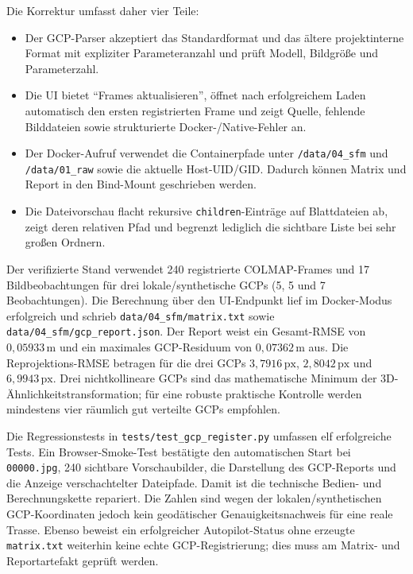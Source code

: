 \documentclass[12pt,a4paper]{article}
\begin{document}
Die Korrektur umfasst daher vier Teile:
\begin{itemize}[noitemsep]
    \item Der GCP-Parser akzeptiert das Standardformat und das ältere
        projektinterne Format mit expliziter Parameteranzahl und prüft
        Modell, Bildgröße und Parameterzahl.
    \item Die UI bietet ``Frames aktualisieren'', öffnet nach erfolgreichem
        Laden automatisch den ersten registrierten Frame und zeigt Quelle,
        fehlende Bilddateien sowie strukturierte Docker-/Native-Fehler an.
    \item Der Docker-Aufruf verwendet die Containerpfade unter
        \texttt{/data/04\_sfm} und \texttt{/data/01\_raw} sowie die aktuelle
        Host-UID/GID. Dadurch können Matrix und Report in den Bind-Mount
        geschrieben werden.
    \item Die Dateivorschau flacht rekursive \texttt{children}-Einträge auf
        Blattdateien ab, zeigt deren relativen Pfad und begrenzt lediglich
        die sichtbare Liste bei sehr großen Ordnern.
\end{itemize}

Der verifizierte Stand verwendet 240 registrierte COLMAP-Frames und 17
Bildbeobachtungen für drei lokale/synthetische GCPs (5, 5 und 7 Beobachtungen).
Die Berechnung über den UI-Endpunkt lief im Docker-Modus erfolgreich und
schrieb \texttt{data/04\_sfm/matrix.txt} sowie
\texttt{data/04\_sfm/gcp\_report.json}. Der Report weist ein Gesamt-RMSE von
$0{,}05933\,\mathrm{m}$ und ein maximales GCP-Residuum von
$0{,}07362\,\mathrm{m}$ aus. Die Reprojektions-RMSE betragen für die drei
GCPs $3{,}7916\,\mathrm{px}$, $2{,}8042\,\mathrm{px}$ und
$6{,}9943\,\mathrm{px}$. Drei nichtkollineare GCPs sind das mathematische
Minimum der 3D-Ähnlichkeitstransformation; für eine robuste praktische
Kontrolle werden mindestens vier räumlich gut verteilte GCPs empfohlen.

Die Regressionstests in \texttt{tests/test\_gcp\_register.py} umfassen elf
erfolgreiche Tests. Ein Browser-Smoke-Test bestätigte den automatischen Start
bei \texttt{00000.jpg}, 240 sichtbare Vorschaubilder, die Darstellung des
GCP-Reports und die Anzeige verschachtelter Dateipfade. Damit ist die
technische Bedien- und Berechnungskette repariert. Die Zahlen sind wegen der
lokalen/synthetischen GCP-Koordinaten jedoch kein geodätischer
Genauigkeitsnachweis für eine reale Trasse. Ebenso beweist ein erfolgreicher
Autopilot-Status ohne erzeugte \texttt{matrix.txt} weiterhin keine echte
GCP-Registrierung; dies muss am Matrix- und Reportartefakt geprüft werden.
\end{document}
